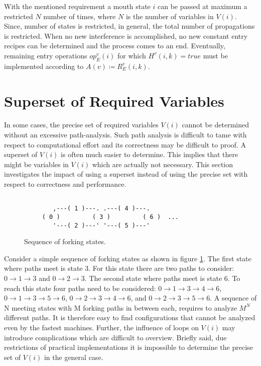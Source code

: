 \documentclass[12pt,a4paper]{scrartcl}
\begin{document}
With the mentioned requirement a mouth state $i$ can be passed at maximum a
restricted $N$ number of times, where $N$ is the number of variables in $V(i)$.
Since, number of states is restricted, in general, the total number of
propagations is restricted. When no new interference is accomplished, no new
constant entry recipes can be determined and the process comes to an end.
Eventually, remaining entry operations $op_E^v(i)$ for which $H^v(i,k)=true$
must be implemented according to $A(v) \coloneqq  R_E^v(i,k)$.

\section{Superset of Required Variables}

In some cases, the precise set of required variables $V(i)$ cannot be
determined without an excessive path-analysis. Such path analysis is difficult
to tame with respect to computational effort and its correctness may be
difficult to proof.  A superset of $V(i)$ is often much easier to determine.
This implies that there might be variables in $V(i)$ which are actually not
necessary. This section investigates the impact of using a superset instead
of using the precise set with respect to correctness and performance. 

\begin{figure}[htbp] \leavevmode \label{fig:fork-states}
\begin{verbatim}
         
        ,---( 1 )---. .---( 4 )---.       
     ( 0 )         ( 3 )         ( 6 )  ...
        '---( 2 )---' '---( 5 )---'

\end{verbatim}
\caption{Sequence of forking states.}
\end{figure}

Consider a simple sequence of forking states as shown in figure
\ref{fig:fork-states}.  The first state where paths meet is state 3. For this
state there are two paths to consider: $0 \rightarrow 1 \rightarrow 3$ and $0
\rightarrow 2 \rightarrow 3$.  The second state where paths meet is state 6. To
reach this state four paths need to be considered: $0 \rightarrow 1 \rightarrow
3 \rightarrow 4 \rightarrow 6$, $0 \rightarrow 1 \rightarrow 3 \rightarrow 5
\rightarrow 6$, $0 \rightarrow 2 \rightarrow 3 \rightarrow 4 \rightarrow 6$,
and $0 \rightarrow 2 \rightarrow 3 \rightarrow 5 \rightarrow 6$. A sequence of
N meeting states with M forking paths in between each, requires to analyze
$M^N$ different paths.  It is therefore easy to find configurations that cannot
be analyzed even by the fastest machines.  Further, the influence of loops on
$V(i)$ may introduce complications which are difficult to overview.  Briefly
said, due restrictions of practical implementations it is impossible to
determine the precise set of $V(i)$ in the general case. 
\end{document}
